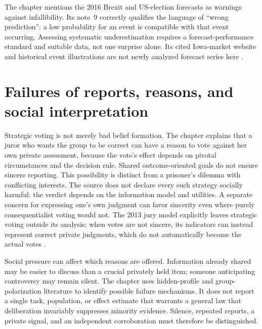 The chapter mentions the 2016 Brexit and US-election forecasts as
warnings against infallibility. Its note~9 correctly qualifies the
language of ``wrong prediction'': a low probability for an event is
compatible with that event occurring. Assessing systematic
underestimation requires a forecast-performance standard and suitable
data, not one surprise alone. Its cited Iowa-market website and historical
event illustrations are not newly analyzed forecast series here
\parencite[p.~585 and n.~9, p.~587]{DietrichSpiekermann2021Social}.

\section{Failures of reports, reasons, and social interpretation}
\label{sec:p18-r101-failures}

Strategic voting is not merely bad belief formation. The chapter explains
that a juror who wants the group to be correct can have a reason to vote
against her own private assessment, because the vote's effect depends
on pivotal circumstances and the decision rule. Shared outcome-oriented
goals do not ensure sincere reporting. This possibility is distinct from
a prisoner's dilemma with conflicting interests. The source does not
declare every such strategy socially harmful: the verdict depends on the
information model and utilities. A separate concern for expressing one's
own judgment can favor sincerity even where purely consequentialist
voting would not. The 2013 jury model explicitly leaves strategic voting
outside its analysis; when votes are not sincere, its indicators can
instead represent correct private judgments, which do not automatically
become the actual votes
\parencite[pp.~585--586]{DietrichSpiekermann2021Social}
\parencite[p.~93]{DietrichSpiekermann2013Defensible}.

Social pressure can affect which reasons are offered. Information already
shared may be easier to discuss than a crucial privately held item;
someone anticipating controversy may remain silent. The chapter uses
hidden-profile and group-polarization literature to identify possible
failure mechanisms. It does not report a single task, population, or
effect estimate that warrants a general law that deliberation invariably
suppresses minority evidence. Silence, repeated reports, a private signal,
and an independent corroboration must therefore be distinguished.

